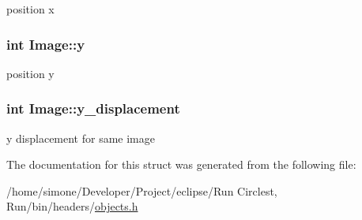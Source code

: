 position x \hypertarget{struct_image_a9b03b7d8dd6f69cb5a444bdd0edd786e}{
\subsubsection[{y}]{\setlength{\rightskip}{0pt plus 5cm}int Image\-::y}}\label{struct_image_a9b03b7d8dd6f69cb5a444bdd0edd786e}
position y \hypertarget{struct_image_aabf0f9008e51f8afa9137459ab410703}{
\subsubsection[{y\-\_\-displacement}]{\setlength{\rightskip}{0pt plus 5cm}int Image\-::y\-\_\-displacement}}\label{struct_image_aabf0f9008e51f8afa9137459ab410703}
y displacement for same image 

The documentation for this struct was generated from the following file\-:\begin{DoxyCompactItemize}
\item 
/home/simone/\-Developer/\-Project/eclipse/\-Run Circlest, Run/bin/headers/\hyperlink{objects_8h}{objects.\-h}\end{DoxyCompactItemize}
